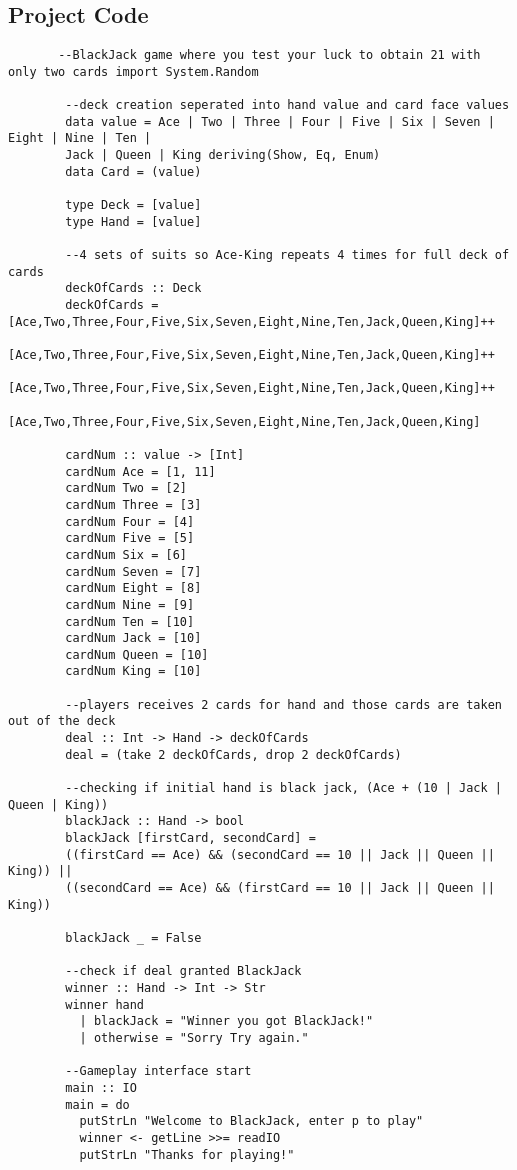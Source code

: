 \documentclass{article}
\begin{document}
    \subsection{Project Code}
    \begin{lstlisting}
       --BlackJack game where you test your luck to obtain 21 with only two cards import System.Random

        --deck creation seperated into hand value and card face values
        data value = Ace | Two | Three | Four | Five | Six | Seven | Eight | Nine | Ten |
        Jack | Queen | King deriving(Show, Eq, Enum)
        data Card = (value)

        type Deck = [value]
        type Hand = [value]
        
        --4 sets of suits so Ace-King repeats 4 times for full deck of cards
        deckOfCards :: Deck
        deckOfCards = [Ace,Two,Three,Four,Five,Six,Seven,Eight,Nine,Ten,Jack,Queen,King]++
                      [Ace,Two,Three,Four,Five,Six,Seven,Eight,Nine,Ten,Jack,Queen,King]++
                      [Ace,Two,Three,Four,Five,Six,Seven,Eight,Nine,Ten,Jack,Queen,King]++
                      [Ace,Two,Three,Four,Five,Six,Seven,Eight,Nine,Ten,Jack,Queen,King]
        
        cardNum :: value -> [Int]
        cardNum Ace = [1, 11]
        cardNum Two = [2]
        cardNum Three = [3]
        cardNum Four = [4]
        cardNum Five = [5]
        cardNum Six = [6]
        cardNum Seven = [7]
        cardNum Eight = [8]
        cardNum Nine = [9]
        cardNum Ten = [10]
        cardNum Jack = [10]
        cardNum Queen = [10]
        cardNum King = [10]
        
        --players receives 2 cards for hand and those cards are taken out of the deck
        deal :: Int -> Hand -> deckOfCards
        deal = (take 2 deckOfCards, drop 2 deckOfCards)
        
        --checking if initial hand is black jack, (Ace + (10 | Jack | Queen | King))
        blackJack :: Hand -> bool
        blackJack [firstCard, secondCard] = 
        ((firstCard == Ace) && (secondCard == 10 || Jack || Queen || King)) ||
        ((secondCard == Ace) && (firstCard == 10 || Jack || Queen || King))
        
        blackJack _ = False
        
        --check if deal granted BlackJack
        winner :: Hand -> Int -> Str
        winner hand
          | blackJack = "Winner you got BlackJack!"
          | otherwise = "Sorry Try again."
        
        --Gameplay interface start
        main :: IO
        main = do
          putStrLn "Welcome to BlackJack, enter p to play"
          winner <- getLine >>= readIO
          putStrLn "Thanks for playing!"

    \end{lstlisting}
\end{document}
